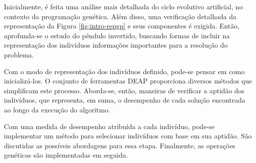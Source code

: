 Inicialmente, é feita uma análise mais detalhada do ciclo evolutivo artificial, no contexto da programação genética. Além disso, uma verificação detalhada da representação da Figura \ref{fig:intro-repgp} e seus componentes é exigida. Então, aprofunda-se o estudo do pêndulo invertido, buscando formas de incluir na representação dos indivíduos informações importantes para a resolução do problema.

Com o modo de representação dos indivíduos definido, pode-se pensar em como inicializá-los. O conjunto de ferramentas DEAP proporciona diversos métodos que simplificam este processo. Aborda-se, então, maneiras de verificar a aptidão dos indivíduos, que representa, em suma, o desempenho de cada solução encontrada ao longo da execução do algoritmo.

Com uma medida de desempenho atribuída a cada indivíduo, pode-se implementar um método para selecionar indivíduos com base em sua aptidão. São discutidas as possíveis abordagens para essa etapa. Finalmente, as operações genéticas são implementadas em seguida.